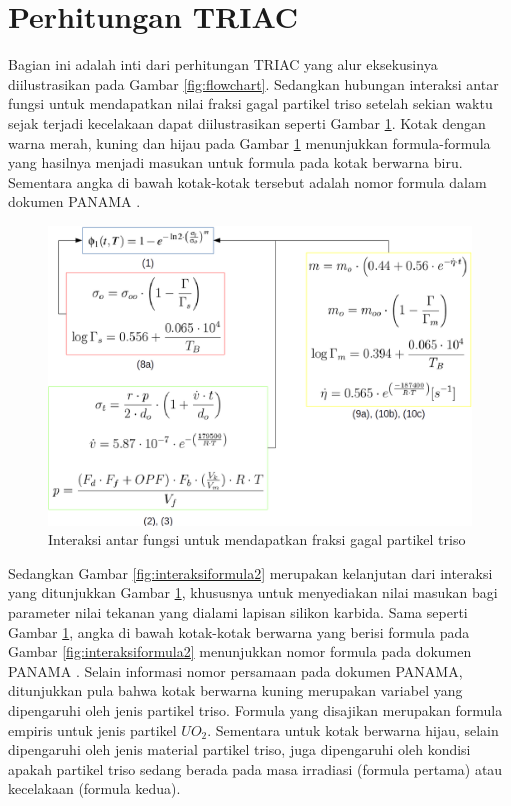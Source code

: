 \documentclass[a4paper,11pt]{report}
\begin{document}
\section{Perhitungan TRIAC}
Bagian ini adalah inti dari perhitungan TRIAC yang alur eksekusinya diilustrasikan pada Gambar \ref{fig:flowchart}. Sedangkan hubungan interaksi antar fungsi untuk mendapatkan nilai fraksi gagal partikel triso setelah sekian waktu sejak terjadi kecelakaan dapat diilustrasikan seperti Gambar \ref{fig:interaksiformula}. Kotak dengan warna merah, kuning dan hijau pada Gambar \ref{fig:interaksiformula} menunjukkan formula-formula yang hasilnya menjadi masukan untuk formula pada kotak berwarna biru. Sementara angka di bawah kotak-kotak tersebut adalah nomor formula dalam dokumen PANAMA \cite{report1}.

\begin{figure}[h]
  \begin{center}
    \includegraphics[scale=.5]{pics/alurRumus1.png}
    \caption{Interaksi antar fungsi untuk mendapatkan fraksi gagal partikel triso}
    \label{fig:interaksiformula}
  \end{center}
\end{figure}


Sedangkan Gambar \ref{fig:interaksiformula2} merupakan kelanjutan dari interaksi yang ditunjukkan Gambar \ref{fig:interaksiformula}, khususnya untuk menyediakan nilai masukan bagi parameter nilai tekanan yang dialami lapisan silikon karbida. Sama seperti Gambar \ref{fig:interaksiformula}, angka di bawah kotak-kotak berwarna yang berisi formula pada Gambar \ref{fig:interaksiformula2} menunjukkan nomor formula pada dokumen PANAMA \cite{report1}. Selain informasi nomor persamaan pada dokumen PANAMA, ditunjukkan pula bahwa kotak berwarna kuning merupakan variabel yang dipengaruhi oleh jenis partikel triso. Formula yang disajikan merupakan formula empiris untuk jenis partikel $UO_2$. Sementara untuk kotak berwarna hijau, selain dipengaruhi oleh jenis material partikel triso, juga dipengaruhi oleh kondisi apakah partikel triso sedang berada pada masa irradiasi (formula pertama) atau kecelakaan (formula kedua). 
\end{document}
